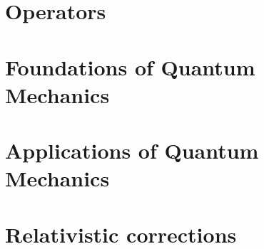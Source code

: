 \documentclass{physics_notes}
\begin{document}
\section{Operators}\label{sec:operators}


\section{Foundations of Quantum Mechanics}\label{sec:foundations}


\section{Applications of Quantum Mechanics}\label{sec:applications}


\section{Relativistic corrections}\label{sec:relativistic_corrections}

\end{document}
